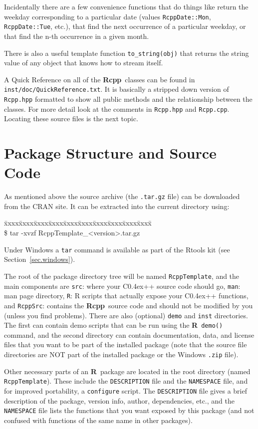 \documentclass{article}
\newenvironment{program}{\ttfamily\begin{tabbing}
\=xxxx\=xxxx\=xxxx\=xxxx\=xxxx\=xxxx\=xxxx\=xxxx\=xxxx\=xxxx\= \+ \kill \\
}{\end{tabbing}}
\def\C++{C{\raise 0.4ex\hbox{\tiny ++}}}
\newcommand{\R}{{\bf R}}
\newcommand{\Rcpp}{{\bf Rcpp}}
\begin{document}
Incidentally there are a few convenience functions that do things like
return the weekday corresponding to a particular date (values
{\tt RcppDate::Mon}, {\tt RcppDate::Tue}, etc.), that find the next
occurrence of a particular weekday, or that find the n-th occurrence in
a given month.

There is also a useful template function {\tt to\_string(obj)} that
returns the string value of any object that knows how to stream itself.

A Quick Reference on all of the \Rcpp\ classes can be found in
{\tt inst/doc/QuickReference.txt}. It is basically a stripped down version
of {\tt Rcpp.hpp} formatted to show all public methods and the
relationship between the classes. For more detail look at the comments in
{\tt Rcpp.hpp} and {\tt Rcpp.cpp}. Locating these source
files is the next topic.

\section{Package Structure and Source Code}

As mentioned above the source archive (the {\tt .tar.gz} file) can be
downloaded from the CRAN site. It can be extracted into the current
directory using:
\begin{program}
\$ tar -xvzf RcppTemplate\_<version>.tar.gz
\end{program}
Under Windows a {\tt tar} command is available as part of the 
Rtools kit (see Section~\ref{sec.windows}).

The root of the package directory tree will be named {\tt RcppTemplate},
and the main components are {\tt src}: where your \C++ source code
should go, {\tt man}: man page directory, {\tt R}: R scripts that
actually expose your \C++ functions, and {\tt RcppSrc}: contains the
\Rcpp\ source code and should not be modified by you (unless you find
problems). There are also (optional) {\tt demo} and {\tt inst} directories.
The first can contain demo scripts that can be run using the \R\
{\tt demo()} command, and the second directory can contain documentation,
data, and license files that you want to be part of the installed package
(note that the source file directories are NOT part of the installed
package or the Windows {\tt .zip} file).

Other necessary parts of an \R\ package are located in the root
directory (named {\tt RcppTemplate}). These include the
{\tt DESCRIPTION} file and the {\tt NAMESPACE} file, and for
improved portability, a {\tt configure} script.
The {\tt DESCRIPTION}
file gives a brief description of the package, version info, author,
dependencies, etc., and the {\tt NAMESPACE} file lists the functions
that you want exposed by this package (and not confused with
functions of the same name in other packages).
\end{document}
